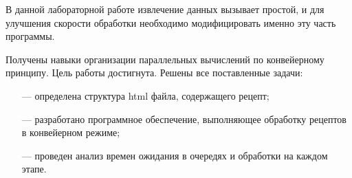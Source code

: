 В данной лабораторной работе извлечение данных вызывает простой, и для улучшения скорости обработки необходимо модифицировать именно эту часть программы.


Получены навыки организации параллельных вычислений по конвейерному принципу. Цель работы достигнута. Решены все поставленные задачи: 
\begin{itemize}
	\item[---] определена структура html файла, содержащего рецепт;
	\item[---] разработано программное обеспечение, выполняющее обработку рецептов в конвейерном режиме;
	\item[---] проведен анализ времен ожидания в очередях и обработки на каждом этапе.
\end{itemize}

